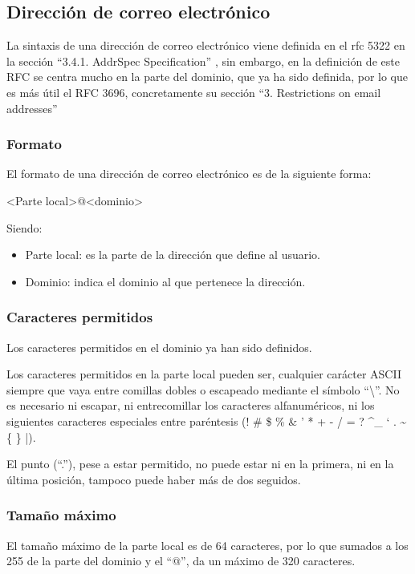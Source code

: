\subsection{Dirección de correo electrónico}
La sintaxis de una dirección de correo electrónico viene definida en el rfc 5322 en la sección “3.4.1.  Addr\-Spec Specification” \cite{rfc5322_section_3_4_1}, sin embargo, en la definición de este RFC se centra mucho en la parte del dominio, que ya ha sido definida, por lo que es más útil el RFC 3696, concretamente su sección “3. Restrictions on email addresses” \cite{rfc3696_section_3}

\subsubsection{Formato}
El formato de una dirección de correo electrónico es de la siguiente forma: 

<Parte local>@<dominio>

Siendo:
\begin{itemize}
    \item Parte local: es la parte de la dirección que define al usuario.
    \item Dominio: indica el dominio al que pertenece la dirección.
\end{itemize} 

\subsubsection{Caracteres permitidos}
Los caracteres permitidos en el dominio ya han sido definidos.

Los caracteres permitidos en la parte local pueden ser, cualquier carácter ASCII siempre que vaya entre comillas dobles o escapeado mediante el símbolo “\textbackslash”. No es necesario ni escapar, ni entrecomillar los caracteres alfanuméricos, ni los siguientes caracteres especiales entre paréntesis (! \# \$ \% \& ' * + - / = ?  \textasciicircum \_ ` . \textasciitilde \{ \} |).

El punto (“.”), pese a estar permitido, no puede estar ni en la primera, ni en la última posición, tampoco puede haber más de dos seguidos. 

\subsubsection{Tamaño máximo}
El tamaño máximo de la parte local es de 64 caracteres, por lo que sumados a los 255 de la parte del dominio y el “@”, da un máximo de 320 caracteres. 

